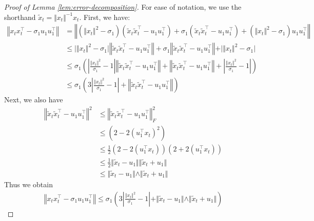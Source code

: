 \begin{proof}[Proof of Lemma \ref{lem:error-decomposition}]
     For ease of notation, we use the shorthand $\tilde{x}_t = \Vert x_t \Vert^{-1} x_t$. First, we have: 
\begin{align*}
        \left\Vert x_t x_t^\top - \sigma_1 u_1 u_1^\top \right\Vert & = \left\Vert (\Vert x_t \Vert^2 - \sigma_1) \left( \tilde{x}_t \tilde{x}_t^\top -  u_1 u_1^\top \right) + \sigma_1 \left( \tilde{x}_t \tilde{x}_t^\top -  u_1 u_1^\top \right) +  (\Vert x_t \Vert^2 - \sigma_1) u_1 u_1^\top  \right\Vert  \\
        & \le  \vert \Vert x_t \Vert^2 - \sigma_1\vert   \left\Vert  \tilde{x}_t \tilde{x}_t^\top -  u_1 u_1^\top \right\Vert + \sigma_1 \left\Vert  \tilde{x}_t \tilde{x}_t^\top -  u_1 u_1^\top \right\Vert  +  \vert \Vert x_t \Vert^2 - \sigma_1\vert  \\
        & \le \sigma_1 \left( \left\vert \frac{\Vert x_t \Vert^2}{\sigma_1} - 1 \right\vert \left\Vert  \tilde{x}_t \tilde{x}_t^\top -  u_1 u_1^\top \right\Vert + \left\Vert  \tilde{x}_t \tilde{x}_t^\top -  u_1 u_1^\top \right\Vert +  \left\vert \frac{\Vert x_t \Vert^2}{\sigma_1} - 1 \right\vert    \right) \\
        & \le \sigma_1 \left( 3 \left\vert \frac{\Vert x_t \Vert^2}{\sigma_1} - 1 \right\vert + \left\Vert  \tilde{x}_t \tilde{x}_t^\top -  u_1 u_1^\top \right\Vert    \right)
\end{align*}
Next, we also have 
\begin{align*}
    \left\Vert  \tilde{x}_t \tilde{x}_t^\top -  u_1 u_1^\top \right\Vert^2 & \le  \left\Vert  \tilde{x}_t \tilde{x}_t^\top -  u_1 u_1^\top \right\Vert_F^2 \\
    & \le (2 - 2 (u_1^\top x_t)^2) \\
    & \le \frac{1}{2}(2 -  2(u_1^\top x_t))(2 +  2(u_1^\top x_t)) \\
    & \le \frac{1}{2} \Vert \tilde{x}_t - u_1 \Vert \Vert \tilde{x}_t + u_1\Vert \\
    & \le \Vert \tilde{x}_t - u_1 \Vert \wedge \Vert \tilde{x}_t + u_1\Vert
\end{align*}
Thus we obtain 
\begin{align}
     \left\Vert x_t x_t^\top - \sigma_1 u_1 u_1^\top \right\Vert  \le \sigma_1 \left( 3 \left\vert \frac{\Vert x_t \Vert^2}{\sigma_1} - 1 \right\vert + \Vert \tilde{x}_t - u_1 \Vert \wedge \Vert \tilde{x}_t + u_1\Vert  \right)
\end{align}


\end{proof}
